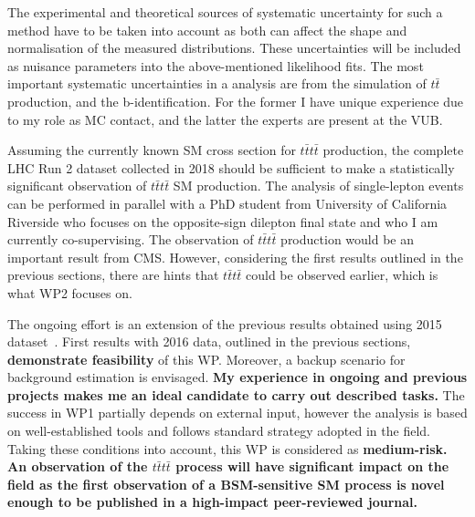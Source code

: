 The experimental and theoretical sources of systematic uncertainty for such a method have to be taken into account as both can affect the shape and normalisation of the measured distributions. These uncertainties will be included as nuisance parameters into the above-mentioned likelihood fits.
The most important systematic uncertainties in a \fourtop analysis are from the simulation of $t\bar{t}$ production, and the b-identification. For the former I have unique experience due to my role as MC contact, and the latter the experts are present at the VUB. 

Assuming the currently known SM cross section for $t\bar{t}t\bar{t}$ production, the complete LHC Run 2 dataset collected in 2018 should be sufficient to make a statistically significant observation of $t\bar{t}t\bar{t}$ SM production. The analysis of single-lepton events can be performed in parallel with a PhD student from University of California Riverside who focuses on the opposite-sign dilepton final state and who I am currently co-supervising. The observation of $t\bar{t}t\bar{t}$ production would be an important result from CMS.  However, considering the first results outlined in the previous sections, there are hints that $t\bar{t}t\bar{t}$ could be observed earlier, which is what WP2 focuses on. 

The ongoing effort is an extension of the previous results obtained using 2015 dataset~\cite{Sirunyan:2017tep}. First results with 2016 data, outlined in the previous sections, \textbf{demonstrate feasibility} of this WP. Moreover, a backup scenario for background estimation is envisaged. \textbf{My experience in ongoing and previous projects makes me an ideal candidate to carry out described tasks.}
The success in WP1 partially depends on external input, however the analysis is based on well-established tools and follows standard strategy adopted in the field. Taking these conditions into account, this WP is considered as \textbf{medium-risk.} \textbf{An observation of the $t\bar{t}t\bar{t}$ process will have significant impact on the field as the first observation of a BSM-sensitive SM \tttt process is novel enough to be published in a high-impact peer-reviewed journal.}

